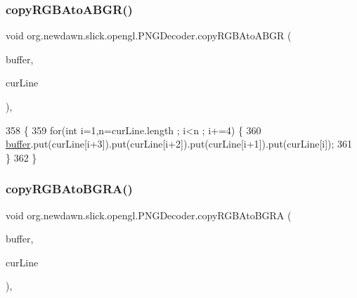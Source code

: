 \subsubsection{\texorpdfstring{copy\+R\+G\+B\+Ato\+A\+B\+G\+R()}{copyRGBAtoABGR()}}
{\footnotesize\ttfamily void org.\+newdawn.\+slick.\+opengl.\+P\+N\+G\+Decoder.\+copy\+R\+G\+B\+Ato\+A\+B\+GR (\begin{DoxyParamCaption}\item[{Byte\+Buffer}]{buffer,  }\item[{byte \mbox{[}$\,$\mbox{]}}]{cur\+Line }\end{DoxyParamCaption})\hspace{0.3cm}{\ttfamily [inline]}, {\ttfamily [private]}}


\begin{DoxyCode}
358                                                                    \{
359         \textcolor{keywordflow}{for}(\textcolor{keywordtype}{int} i=1,n=curLine.length ; i<n ; i+=4) \{
360             \mbox{\hyperlink{classorg_1_1newdawn_1_1slick_1_1opengl_1_1_p_n_g_decoder_ae205f9222586a2bc01a8a240c5c210ad}{buffer}}.put(curLine[i+3]).put(curLine[i+2]).put(curLine[i+1]).put(curLine[i]);
361         \}
362     \}
\end{DoxyCode}
\mbox{\label{classorg_1_1newdawn_1_1slick_1_1opengl_1_1_p_n_g_decoder_a8c5b826b6abd782f69528d39e71183c3}} 
\subsubsection{\texorpdfstring{copy\+R\+G\+B\+Ato\+B\+G\+R\+A()}{copyRGBAtoBGRA()}}
{\footnotesize\ttfamily void org.\+newdawn.\+slick.\+opengl.\+P\+N\+G\+Decoder.\+copy\+R\+G\+B\+Ato\+B\+G\+RA (\begin{DoxyParamCaption}\item[{Byte\+Buffer}]{buffer,  }\item[{byte \mbox{[}$\,$\mbox{]}}]{cur\+Line }\end{DoxyParamCaption})\hspace{0.3cm}{\ttfamily [inline]}, {\ttfamily [private]}}


